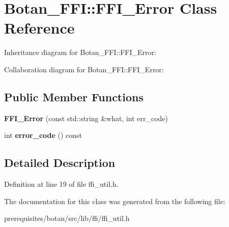 \hypertarget{class_botan___f_f_i_1_1_f_f_i___error}{}\section{Botan\+\_\+\+F\+FI\+:\+:F\+F\+I\+\_\+\+Error Class Reference}
\label{class_botan___f_f_i_1_1_f_f_i___error}


Inheritance diagram for Botan\+\_\+\+F\+FI\+:\+:F\+F\+I\+\_\+\+Error\+:


Collaboration diagram for Botan\+\_\+\+F\+FI\+:\+:F\+F\+I\+\_\+\+Error\+:
\subsection*{Public Member Functions}
\begin{DoxyCompactItemize}
\item 
\mbox{\label{class_botan___f_f_i_1_1_f_f_i___error_a659d049710add456642271f061afb186}} 
{\bfseries F\+F\+I\+\_\+\+Error} (const std\+::string \&what, int err\+\_\+code)
\item 
\mbox{\label{class_botan___f_f_i_1_1_f_f_i___error_ae1e97783aeea3b3ec5bea8e0a9899d41}} 
int {\bfseries error\+\_\+code} () const
\end{DoxyCompactItemize}


\subsection{Detailed Description}


Definition at line 19 of file ffi\+\_\+util.\+h.



The documentation for this class was generated from the following file\+:\begin{DoxyCompactItemize}
\item 
prerequisites/botan/src/lib/ffi/ffi\+\_\+util.\+h\end{DoxyCompactItemize}
